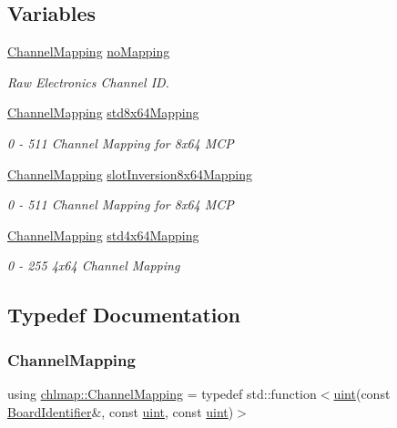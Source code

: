 \subsection*{Variables}
\begin{DoxyCompactItemize}
\item 
\hyperlink{namespacechlmap_a5bb86fec567a6f1a0646881a9284bb01}{Channel\+Mapping} \hyperlink{namespacechlmap_adeefba45d9765c580e5f7ef9cb99acc5}{no\+Mapping}
\begin{DoxyCompactList}\small\item\em Raw Electronics Channel ID. \end{DoxyCompactList}\item 
\hyperlink{namespacechlmap_a5bb86fec567a6f1a0646881a9284bb01}{Channel\+Mapping} \hyperlink{namespacechlmap_a11d7121de30a32ead9032c59221b7442}{std8x64\+Mapping}
\begin{DoxyCompactList}\small\item\em 0 -\/ 511 Channel Mapping for 8x64 M\+CP \end{DoxyCompactList}\item 
\hyperlink{namespacechlmap_a5bb86fec567a6f1a0646881a9284bb01}{Channel\+Mapping} \hyperlink{namespacechlmap_addbd4a4856137809b06e1bffd39e2897}{slot\+Inversion8x64\+Mapping}
\begin{DoxyCompactList}\small\item\em 0 -\/ 511 Channel Mapping for 8x64 M\+CP \end{DoxyCompactList}\item 
\hyperlink{namespacechlmap_a5bb86fec567a6f1a0646881a9284bb01}{Channel\+Mapping} \hyperlink{namespacechlmap_a8acaf58562324b3f691a218f08c7afe4}{std4x64\+Mapping}
\begin{DoxyCompactList}\small\item\em 0 -\/ 255 4x64 Channel Mapping \end{DoxyCompactList}\end{DoxyCompactItemize}


\subsection{Typedef Documentation}
\mbox{\label{namespacechlmap_a5bb86fec567a6f1a0646881a9284bb01}} 
\subsubsection{\texorpdfstring{Channel\+Mapping}{ChannelMapping}}
{\footnotesize\ttfamily using \hyperlink{namespacechlmap_a5bb86fec567a6f1a0646881a9284bb01}{chlmap\+::\+Channel\+Mapping} = typedef std\+::function$<$\hyperlink{namespacechlmap_a51093e4e5b1ccf24696e04d671728200}{uint}(const \hyperlink{class_board_identifier}{Board\+Identifier}\&, const \hyperlink{namespacechlmap_a51093e4e5b1ccf24696e04d671728200}{uint}, const \hyperlink{namespacechlmap_a51093e4e5b1ccf24696e04d671728200}{uint})$>$}

